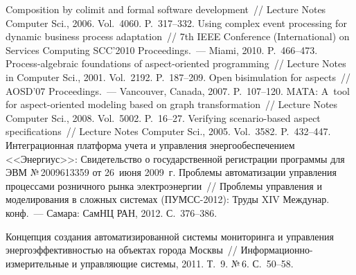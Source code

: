 \begin{multicols}{2}
{{\begin{thebibliography}{99}
 Composition by colimit and formal software development~// Lecture Notes 
Computer Sci., 2006. Vol.~4060. P.~317--332.
Using complex event processing for dynamic business process adaptation~//  7th IEEE Conference 
(International) on Services Computing SCC'2010 Proceedings.~--- Miami, 2010. P.~466--473.
Process-algebraic foundations of aspect-oriented programming~// Lecture Notes in Computer Sci., 
2001. Vol.~2192. P.~187--209.
Open bisimulation for aspects~//  AOSD'07 Proceedings.~--- Vancouver, Canada, 2007. 
P.~107--120.
MATA: A~tool for aspect-oriented modeling based on graph transformation~// Lecture Notes  
Computer Sci., 2008. Vol.~5002. P.~16--27.
 Verifying scenario-based aspect specifications~// Lecture Notes Computer 
Sci., 2005. Vol.~3582. P.~432--447.
Интеграционная платформа учета и управления энергообеспечением <<Энергиус>>: 
Свидетельство о государственной регистрации программы для ЭВМ №\,2009613359 от 
26~июня 2009~г.
 Проблемы 
автоматизации управления процессами розничного рынка электроэнергии~// Проблемы 
управления и моделирования в сложных системах (ПУМСС-2012): Труды XIV 
Междунар. конф.~--- Самара: СамНЦ РАН, 2012. С.~376--386.

\label{end\stat}

Концепция создания автоматизированной системы мониторинга и управления 
энергоэффективностью на объектах города Москвы~// 
Ин\-фор\-ма\-ци\-он\-но-из\-ме\-ри\-тель\-ные и управ\-ля\-ющие сис\-те\-мы, 2011. Т.~9. 
№\,6. С.~50--58.
\end{thebibliography}
} }

\end{multicols}
